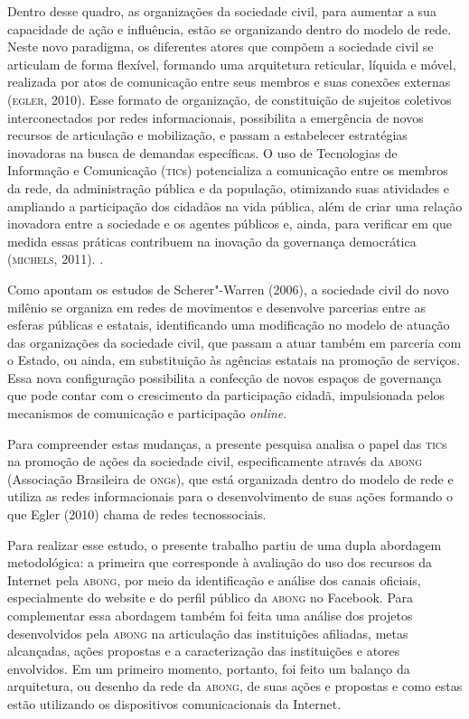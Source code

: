 Dentro desse quadro, as organizações da sociedade civil, para aumentar a
sua capacidade de ação e influência, estão se organizando dentro do
modelo de rede. Neste novo paradigma, os diferentes atores que compõem a
sociedade civil se articulam de forma flexível, formando uma arquitetura
reticular, líquida e móvel, realizada por atos de comunicação entre seus
membros e suas conexões externas (\textsc{egler}, 2010). Esse formato de
organização, de constituição de sujeitos coletivos interconectados por
redes informacionais, possibilita a emergência de novos recursos de
articulação e mobilização, e passam a estabelecer estratégias inovadoras
na busca de demandas específicas. O uso de Tecnologias de Informação e
Comunicação (\textsc{tic}s) potencializa a comunicação entre os membros da rede,
da administração pública e da população, otimizando suas atividades e
ampliando a participação dos cidadãos na vida pública, além de criar uma
relação inovadora entre a sociedade e os agentes públicos e, ainda, para
verificar em que medida essas práticas contribuem na inovação da
governança democrática (\textsc{michels}, 2011). .

Como apontam os estudos de Scherer"-Warren (2006), a sociedade civil do
novo milênio se organiza em redes de movimentos e desenvolve parcerias
entre as esferas públicas e estatais, identificando uma modificação no
modelo de atuação das organizações da sociedade civil, que passam a
atuar também em parceria com o Estado, ou ainda, em substituição às
agências estatais na promoção de serviços. Essa nova configuração
possibilita a confecção de novos espaços de governança que pode contar
com o crescimento da participação cidadã, impulsionada pelos mecanismos
de comunicação e participação \emph{\emph{online}}.

Para compreender estas mudanças, a presente pesquisa analisa o papel das
\textsc{tic}s na promoção de ações da sociedade civil, especificamente através da
\textsc{abong} (Associação Brasileira de \textsc{ong}s), que está organizada dentro do
modelo de rede e utiliza as redes informacionais para o desenvolvimento
de suas ações formando o que Egler (2010) chama de redes tecnossociais.

Para realizar esse estudo, o presente trabalho partiu de uma dupla
abordagem metodológica: a primeira que corresponde à avaliação do uso
dos recursos da Internet pela \textsc{abong}, por meio da identificação e análise
dos canais oficiais, especialmente do website e do perfil público da
\textsc{abong} no Facebook. Para complementar essa abordagem também foi feita uma
análise dos projetos desenvolvidos pela \textsc{abong} na articulação das
instituições afiliadas, metas alcançadas, ações propostas e a
caracterização das instituições e atores envolvidos. Em um primeiro
momento, portanto, foi feito um balanço da arquitetura, ou desenho da
rede da \textsc{abong}, de suas ações e propostas e como estas estão utilizando
os dispositivos comunicacionais da Internet.

